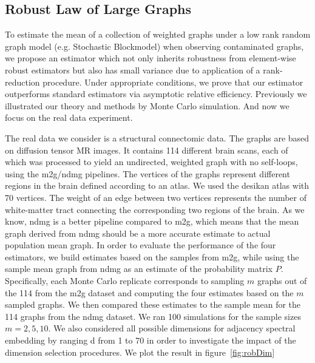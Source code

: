 \documentclass[simplex.tex]{subfiles}
\begin{document}
\subsection{Robust Law of Large Graphs}
To estimate the mean of a collection of weighted graphs under a
low rank random graph model (e.g. Stochastic Blockmodel) when
observing contaminated graphs, we propose an estimator which not
only inherits robustness from element-wise robust estimators but
also has small variance due to application of a rank-reduction
procedure. Under appropriate conditions, we prove that our
estimator outperforms standard estimators via asymptotic relative
efficiency.  Previously we illustrated our theory and methods by Monte
Carlo simulation. And now we focus on the real data experiment.


The real data we consider is a structural connectomic data.
The graphs are based on diffusion tensor MR
images. It contains 114 different brain scans, each of
which was processed to yield an undirected, weighted graph with no
self-loops, using the m2g/ndmg pipelines.  The vertices of the graphs
represent different regions in the brain defined according to an atlas.
We used the  desikan atlas with 70 vertices. The weight of an edge
between two vertices represents the number of white-matter tract
connecting the corresponding two regions of the brain.
As we know, ndmg is a better pipeline compared to m2g, which means that the mean graph derived from ndmg should be a more accurate estimate to actual population mean graph.
In order to evaluate the performance of the four estimators, we build estimates based on the samples from m2g, while using the sample mean graph from ndmg as an estimate of the probability matrix $P$.
Specifically, each Monte Carlo replicate corresponds to sampling $m$ graphs out
of the 114 from the m2g dataset and computing the four estimates based on the $m$ sampled graphs.
We then compared these estimates to the sample mean for the 114 graphs from the ndmg dataset.
We ran 100 simulations for the sample sizes $m=2, 5, 10$.
We also considered all possible dimensions for adjacency spectral embedding by ranging d from 1 to 70 in
order to investigate the impact of the dimension selection procedures.
We plot the result in figure~\ref{fig:robDim}
\end{document}
